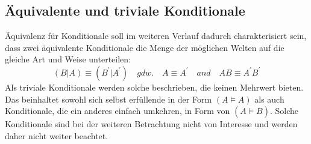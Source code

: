 \documentclass[12pt,a4paper]{article}
\begin{document}
\subsection{Äquivalente und triviale Konditionale}
Äquivalenz für Konditionale soll im weiteren Verlauf dadurch charakterisiert sein, dass zwei äquivalente Konditionale die Menge der möglichen Welten auf die gleiche Art und Weise unterteilen:
\begin{equation}
(B|A)\equiv (B^\prime|A^\prime) \quad gdw. \quad A\equiv A^\prime \quad and \quad AB \equiv A^\prime B^\prime
\end{equation}
Als triviale Konditionale werden solche beschrieben, die keinen Mehrwert bieten. Das beinhaltet sowohl sich selbst erfüllende in der Form $(A \models A)$ als auch Konditionale, die ein anderes einfach umkehren, in Form von $(A \models \overline{B})$. Solche Konditionale sind bei der weiteren Betrachtung nicht von Interesse und werden daher nicht weiter beachtet.
\end{document}
